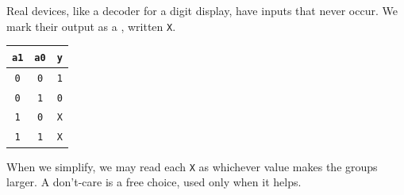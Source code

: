 \documentclass[mathserif, handout]{beamer}
\newcommand{\ttab}[1]{\texttt{#1}}
\begin{document}
\begin{frame}
  Real devices, like a decoder for a digit display, have inputs that never occur. We mark their output as a , written \ttab{X}.\\[4mm]
  \begin{center}
    \renewcommand{\arraystretch}{1.2}
    \begin{tabular}{cc|c}
      \ttab{a1} & \ttab{a0} & \ttab{y} \\ \hline
      \ttab{0} & \ttab{0} & \ttab{1} \\
      \ttab{0} & \ttab{1} & \ttab{0} \\
      \ttab{1} & \ttab{0} & \ttab{X} \\
      \ttab{1} & \ttab{1} & \ttab{X} \\
    \end{tabular}
  \end{center}
    When we simplify, we may read each \ttab{X} as whichever value makes the groups larger. A don't-care is a free choice, used only when it helps.
\end{frame}
\end{document}
